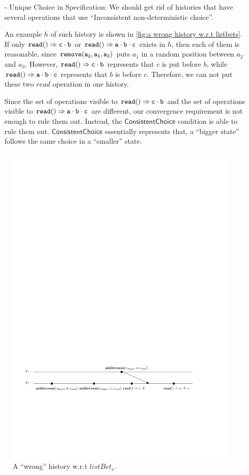 {\begin{itemize}
\item[-] Unique Choice in Specification: We should get rid of histories that have several operations that use ``Inconsistent non-deterministic choice''.

An example $h$ of such history is shown in \autoref{fig:a wrong history w.r.t listbets}. If only $\alabellong[{\tt read}]{}{c \cdot b}{}$ or $\alabellong[{\tt read}]{}{a \cdot b \cdot c}{}$ exists in $h$, then each of them is reasonable, since $\alabelshort[{\tt remove}]{a_2,a_1,a_3}$ puts $a_1$ in a random position between $a_2$ and $a_3$. However, $\alabellong[{\tt read}]{}{c \cdot b}{}$ represents that $c$ is put before $b$, while $\alabellong[{\tt read}]{}{a \cdot b \cdot c}{}$ represents that $b$ is before $c$. Therefore, we can not put these two $read$ operation in one history.

Since the set of operations visible to $\alabellong[{\tt read}]{}{c \cdot b}{}$ and the set of operations visible to $\alabellong[{\tt read}]{}{a \cdot b \cdot c}{}$ are different, our convergence requirement is not enough to rule them out. Instead, the $\mathsf{ConsistentChoice}$ condition is able to rule them out. $\mathsf{ConsistentChoice}$ essentially represents that, a ``bigger state'' follows the same choice in a ``smaller'' state.
\end{itemize}

\begin{figure}[t]
  \centering
  \includegraphics[width=0.85 \textwidth]{figures/ErrorExecutionofWooki.pdf}
\vspace{-10pt}
  \caption{A ``wrong'' history w.r.t $\mathit{listBet}_s$.}
  \label{fig:a wrong history w.r.t listbets}
\end{figure}


}
